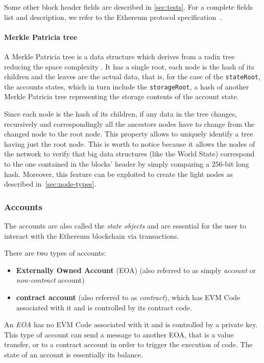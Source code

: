 Some other block header fields are described in \autoref{sec:tests}. For a
complete fields list and description, we refer to the Ethereum protocol
specification~\cite{wood2018ethereum}.

\paragraph{Merkle Patricia tree}
A Merkle Patricia tree is a data structure which derives from a radix tree
reducing the space complexity \cite{patriciatree}. It has a single root, each
node is the hash of its children and the leaves are the actual data, that is,
for the case of the \verb+stateRoot+, the accounts states, which in turn include
the \verb+storageRoot+, a hash of another Merkle Patricia tree representing the
storage contents of the account state.

Since each node is the hash of its children, if any data in the tree changes,
recursively and correspondingly all the ancestors nodes have to change from the
changed node to the root node. This property allows to uniquely identify a tree
having just the root node. This is worth to notice because it allows the nodes
of the network to verify that big data structures (like the World State)
correspond to the one contained in the blocks' header by simply comparing a
$256$-bit long hash. Moreover, this feature can be exploited to create the light
nodes as described in~\autoref{sec:node-types}.


\subsubsection{Accounts}
\label{sec:accounts}

The accounts are also called the \emph{state objects} and are essential for the
user to interact with the Ethereum blockchain via transactions.

There are two types of accounts:

\begin{itemize}
  \item \textbf{Externally Owned Account} (EOA) (also referred to as simply
  \emph{account} or \emph{non-contract} account)
  \item \textbf{contract account} (also referred to as \emph{contract}), which
  has EVM Code associated with it and is controlled by its contract code.
\end{itemize}

An \emph{EOA} has no EVM Code associated with it and is controlled by a private
key. This type of account can send a message to another EOA, that is a value
transfer, or to a contract account in order to trigger the execution of code.
The state of an account is essentially its balance.

